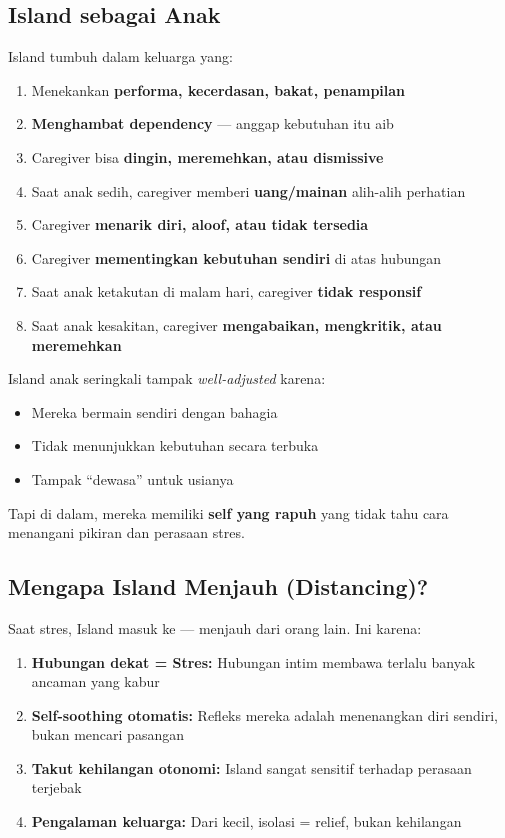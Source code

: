 \subsection{Island sebagai Anak}

Island tumbuh dalam keluarga yang:
\begin{enumerate}
    \item Menekankan \textbf{performa, kecerdasan, bakat, penampilan}
    \item \textbf{Menghambat dependency} --- anggap kebutuhan itu aib
    \item Caregiver bisa \textbf{dingin, meremehkan, atau dismissive}
    \item Saat anak sedih, caregiver memberi \textbf{uang/mainan} alih-alih perhatian
    \item Caregiver \textbf{menarik diri, aloof, atau tidak tersedia}
    \item Caregiver \textbf{mementingkan kebutuhan sendiri} di atas hubungan
    \item Saat anak ketakutan di malam hari, caregiver \textbf{tidak responsif}
    \item Saat anak kesakitan, caregiver \textbf{mengabaikan, mengkritik, atau meremehkan}
\end{enumerate}

\begin{warningbox}
Island anak seringkali tampak \textit{well-adjusted} karena:
\begin{itemize}
    \item Mereka bermain sendiri dengan bahagia
    \item Tidak menunjukkan kebutuhan secara terbuka
    \item Tampak ``dewasa'' untuk usianya
\end{itemize}

Tapi di dalam, mereka memiliki \textbf{self yang rapuh} yang tidak tahu cara menangani pikiran dan perasaan stres.
\end{warningbox}

\subsection{Mengapa Island Menjauh (Distancing)?}

Saat stres, Island masuk ke  --- menjauh dari orang lain. Ini karena:

\begin{enumerate}
    \item \textbf{Hubungan dekat = Stres:} Hubungan intim membawa terlalu banyak ancaman yang kabur
    \item \textbf{Self-soothing otomatis:} Refleks mereka adalah menenangkan diri sendiri, bukan mencari pasangan
    \item \textbf{Takut kehilangan otonomi:} Island sangat sensitif terhadap perasaan terjebak
    \item \textbf{Pengalaman keluarga:} Dari kecil, isolasi = relief, bukan kehilangan
\end{enumerate}

